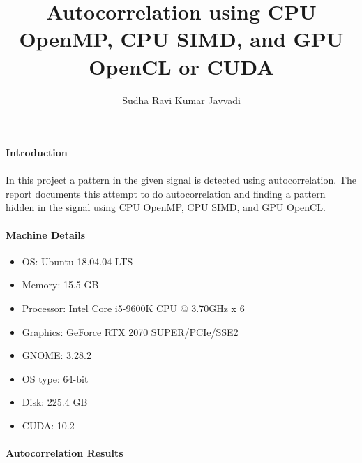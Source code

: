 \documentclass[notitlepage]{report}
\title{Autocorrelation using CPU OpenMP, CPU SIMD, and GPU {OpenCL or CUDA}}
\author{Sudha Ravi Kumar Javvadi}
\begin{document}
	\maketitle
	
	\paragraph{Introduction}
	\paragraph{} In this project a pattern in the given signal is detected using autocorrelation. The report documents this attempt to do autocorrelation and finding a pattern hidden in the signal using CPU OpenMP, CPU SIMD, and GPU OpenCL.
	
	\paragraph{Machine Details}
	\begin{itemize}
		\item{OS}: Ubuntu 18.04.04 LTS
		\item{Memory}: 15.5 GB
		\item{Processor}: Intel Core i5-9600K CPU @ 3.70GHz x 6
		\item{Graphics}: GeForce RTX 2070 SUPER/PCIe/SSE2
		\item{GNOME}: 3.28.2
		\item{OS type}: 64-bit
		\item{Disk}: 225.4 GB
		\item{CUDA}: 10.2
	\end{itemize}

	\paragraph{Autocorrelation Results}
\end{document}

